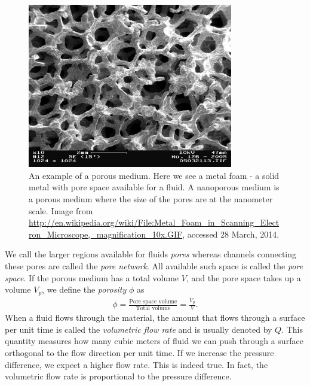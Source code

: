 \begin{figure}[htb]
\begin{center}
\includegraphics[width=0.8\textwidth, trim=0cm 0cm 0cm 0cm, clip]{figures/metal_foam.png}
\end{center}
\caption{An example of a porous medium. Here we see a metal foam - a solid metal with pore space available for a fluid. A nanoporous medium is a porous medium where the size of the pores are at the nanometer scale. Image from \url{http://en.wikipedia.org/wiki/File:Metal_Foam_in_Scanning_Electron_Microscope,_magnification_10x.GIF}, accessed 28 March, 2014.}
\label{fig:porous_medium}
\end{figure}

We call the larger regions available for fluids \textit{pores} whereas channels connecting these pores are called the \textit{pore network}. All available such space is called the \textit{pore space}. If the porous medium has a total volume $V$, and the pore space takes up a volume $V_p$, we define the \textit{porosity} $\phi$ as
\begin{align}
	\phi = \frac{\text{Pore space volume}}{\text{Total volume}} = \frac{V_p}{V}.
\end{align}
When a fluid flows through the material, the amount that flows through a surface per unit time is called the \textit{volumetric flow rate} and is usually denoted by $Q$. This quantity measures how many cubic meters of fluid we can push through a surface orthogonal to the flow direction per unit time. If we increase the pressure difference, we expect a higher flow rate. This is indeed true. In fact, the volumetric flow rate is proportional to the pressure difference.

